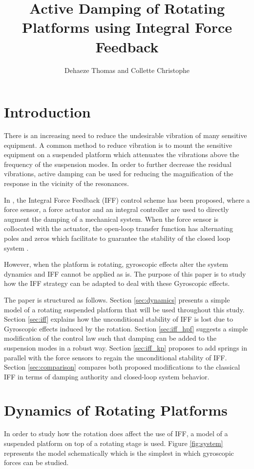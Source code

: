 \documentclass[Afour,sagev,times]{sagej}
\author{Dehaeze Thomas\affilnum{1} and Collette Christophe\affilnum{2}}
\affiliation{\affilnum{1}Precision Mechatronics Laboratory, University of Liege, Belgium\\
\affilnum{2}BEAMS Department, Free University of Brussels, Belgium\\
\affilnum{3}European Synchrotron Radiation Facility, Grenoble, France}
\date{}
\title{Active Damping of Rotating Platforms using Integral Force Feedback}
\begin{document}
\maketitle

\section{Introduction}
\label{sec:orgdef8140}
\label{sec:introduction}
There is an increasing need to reduce the undesirable vibration of many sensitive equipment.
A common method to reduce vibration is to mount the sensitive equipment on a suspended platform which attenuates the vibrations above the frequency of the suspension modes.
In order to further decrease the residual vibrations, active damping can be used for reducing the magnification of the response in the vicinity of the resonances.

In \cite{preumont92_activ_dampin_by_local_force}, the Integral Force Feedback (IFF) control scheme has been proposed, where a force sensor, a force actuator and an integral controller are used to directly augment the damping of a mechanical system.
When the force sensor is collocated with the actuator, the open-loop transfer function has alternating poles and zeros which facilitate to guarantee the stability of the closed loop system \cite{preumont02_force_feedb_versus_accel_feedb}.

However, when the platform is rotating, gyroscopic effects alter the system dynamics and IFF cannot be applied as is.
The purpose of this paper is to study how the IFF strategy can be adapted to deal with these Gyroscopic effects.

The paper is structured as follows.
Section \ref{sec:dynamics} presents a simple model of a rotating suspended platform that will be used throughout this study.
Section \ref{sec:iff} explains how the unconditional stability of IFF is lost due to Gyroscopic effects induced by the rotation.
Section \ref{sec:iff_hpf} suggests a simple modification of the control law such that damping can be added to the suspension modes in a robust way.
Section \ref{sec:iff_kp} proposes to add springs in parallel with the force sensors to regain the unconditional stability of IFF.
Section \ref{sec:comparison} compares both proposed modifications to the classical IFF in terms of damping authority and closed-loop system behavior.

\section{Dynamics of Rotating Platforms}
\label{sec:org392ac57}
\label{sec:dynamics}
In order to study how the rotation does affect the use of IFF, a model of a suspended platform on top of a rotating stage is used.
Figure \ref{fig:system} represents the model schematically which is the simplest in which gyroscopic forces can be studied.
\end{document}
